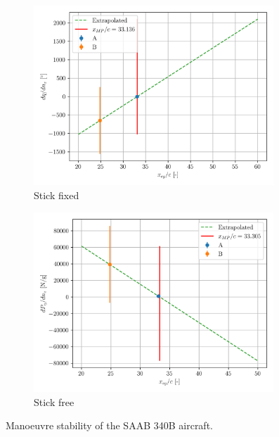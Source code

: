 \documentclass{article}
\begin{document}
\begin{figure}[H]
    \centering
    \begin{subfigure}{0.45\textwidth}
        \centering
        \includegraphics[width=0.99\textwidth]{../exercise1/Manoeuvre_Stability_2.png}
        \caption{Stick fixed}
    \end{subfigure}
    \begin{subfigure}{0.45\textwidth}
        \centering
        \includegraphics[width=0.99\textwidth]{../exercise1/Manoeuvre_Stability_4.png}
        \caption{Stick free}
    \end{subfigure}
    \caption{Manoeuvre stability of the SAAB 340B aircraft.}
    \label{fig:Manoeuvre_stability}
\end{figure}
\end{document}
